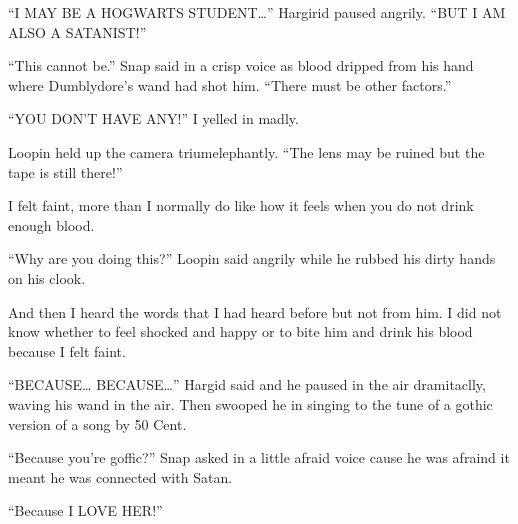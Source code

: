 \enquote{I MAY BE A HOGWARTS STUDENT\ldots{}} Hargirid paused angrily. \enquote{BUT I AM ALSO A SATANIST\@!}

\enquote{This cannot be.} Snap said in a crisp voice as blood dripped from his hand where Dumblydore's wand had shot him. \enquote{There must be other factors.}

\enquote{YOU DON'T HAVE ANY\@!} I yelled in madly.

Loopin held up the camera triumelephantly. \enquote{The lens may be ruined but the tape is still there!}

I felt faint, more than I normally do like how it feels when you do not drink enough blood.

\begin{sloppypar}
    \enquote{Why are you doing this?} Loopin said angrily while he rubbed his dirty hands on his clook.
\end{sloppypar}

And then I heard the words that I had heard before but not from him. I did not know whether to feel shocked and happy or to bite him and drink his blood because I felt faint.

\enquote{BECAUSE\ldots{} BECAUSE\ldots{}} Hargid said and he paused in the air dramitaclly, waving his wand in the air. Then swooped he in singing to the tune of a gothic version of a song by 50 Cent.

\enquote{Because you're goffic?} Snap asked in a little afraid voice cause he was afraind it meant he was connected with Satan.

\enquote{Because I LOVE HER\@!}
